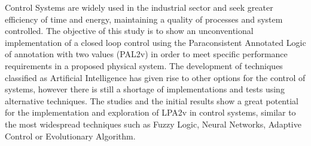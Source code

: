 Control Systems are widely used in the industrial sector and seek greater efficiency of time and energy, maintaining a quality of processes and system controlled.
%
The objective of this study is to show an unconventional implementation of a closed loop control using the Paraconsistent Annotated Logic of annotation with two values (PAL2v) in order to meet specific performance requirements in a proposed physical system.
%
The development of techniques classified as Artificial Intelligence has given rise to other options for the control of systems, however there is still a shortage of implementations and tests using alternative techniques.
%
The studies and the initial results show a great potential for the implementation and exploration of LPA2v in control systems, similar to the most widespread techniques such as Fuzzy Logic, Neural Networks, Adaptive Control or Evolutionary Algorithm.



